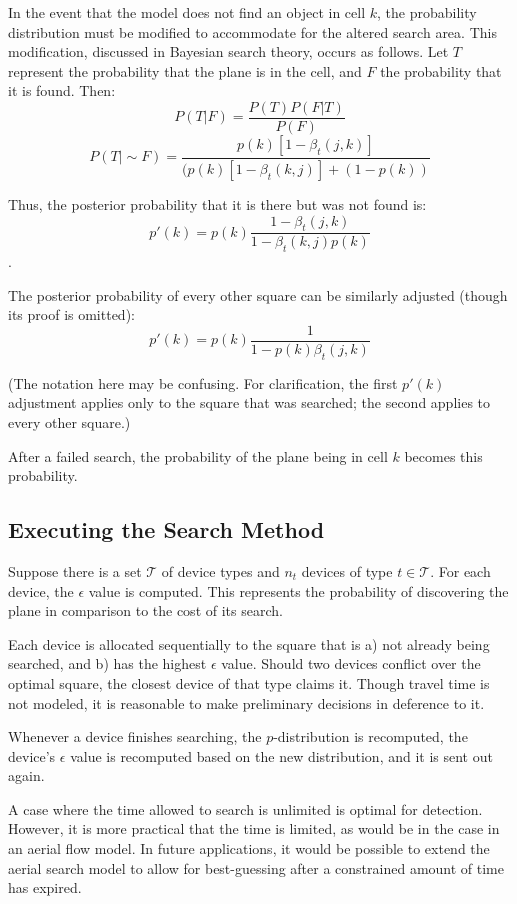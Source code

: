 \documentclass[a4paper]{article}
\begin{document}
In the event that the model does not find an object in cell $k$, the probability distribution must be modified to accommodate for the altered search area. This modification, discussed in Bayesian search theory, occurs as follows. Let $T$ represent the probability that the plane is in the cell, and $F$ the probability that it is found. Then: 
$$P(T|F)=\frac{P(T)P(F|T)}{P(F)}$$ 
$$P(T|\sim F)=\frac{p(k)[1-\beta_t(j,k)]}{(p(k)[1-\beta_t(k,j)]+(1-p(k))}$$

Thus, the posterior probability that it is there but was not found is: $$p'(k)=p(k)\frac{1-\beta_t(j,k)}{1-\beta_t(k,j)p(k)}$$.

The posterior probability of every other square can be similarly adjusted (though its proof is omitted): $$p'(k)=p(k)\frac{1}{1-p(k)\beta_t(j,k)}$$

(The notation here may be confusing. For clarification, the first $p'(k)$ adjustment applies only to the square that was searched; the second applies to every other square.)

After a failed search, the probability of the plane being in cell $k$ becomes this probability.

\subsection{Executing the Search Method}

Suppose there is a set $\mathcal{T}$ of device types and $n_t$ devices of type $t\in\mathcal{T}$. For each device, the $\epsilon$ value is computed. This represents the probability of discovering the plane in comparison to the cost of its search.

Each device is allocated sequentially to the square that is a) not already being searched, and b) has the highest $\epsilon$ value. Should two devices conflict over the optimal square, the closest device of that type claims it. Though travel time is not modeled, it is reasonable to make preliminary decisions in deference to it.

Whenever a device finishes searching, the $p$-distribution is recomputed, the device's $\epsilon$ value is recomputed based on the new distribution, and it is sent out again. 

A case where the time allowed to search is unlimited is optimal for detection. However, it is more practical that the time is limited, as would be in the case in an aerial flow model. In future applications, it would be possible to extend the aerial search model to allow for best-guessing after a constrained amount of time has expired.
\end{document}
